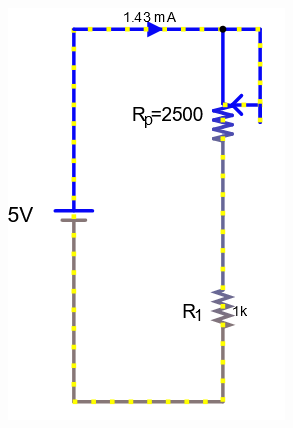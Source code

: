 \documentclass[a4paper]{article}
\begin{document}
\begin{figure}[H]
\begin{subfigure}{0.333\textwidth}
        \includegraphics[width=.9\linewidth]{amp5}
    \end{subfigure}
    \begin{subfigure}{0.333\textwidth}

\end{subfigure}
\end{figure}
\end{document}
